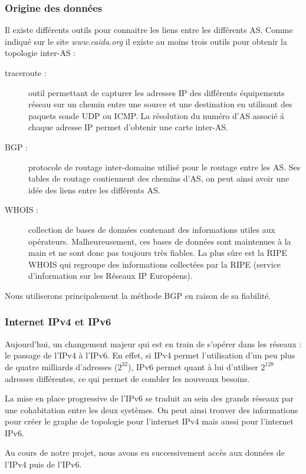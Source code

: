 \subsubsection{Origine des donn\'ees}
\par
Il existe diff\'erents outils pour connaitre les liens entre les diff\'erents AS. Comme indiqu\'e sur le site \textit{www.caida.org} il existe au moins trois outils pour obtenir la topologie inter-AS :
\begin{description}
 \item[traceroute : ] outil permettant de capturer les adresses IP des diff\'erents \'equipements r\'eseau sur un chemin entre une source et une destination en utilisant des paquets sonde UDP ou ICMP. La r\'esolution du num\'ero d'AS associ\'e \'a chaque adresse IP permet d'obtenir une carte inter-AS.
 \item[BGP : ] protocole de routage inter-domaine utilis\'e pour le routage entre les AS. Ses tables de routage contiennent des chemins d'AS, on peut ainsi avoir une idée des liens entre les diff\'erents AS.
 \item[WHOIS : ] collection de bases de donn\'ees contenant des informations utiles aux op\'erateurs. Malheureusement, ces bases de donn\'ees sont maintenues \`a la main et ne  sont donc pas toujours tr\`es fiables. La plus sûre est la RIPE WHOIS qui regroupe des informations collect\'ees par la RIPE (service d'information sur les R\'eseaux IP Europ\'eens).
\end{description}
\par
Nous utiliserons principalement la m\'ethode BGP en raison de sa fiabilit\'e.

\subsubsection{Internet IPv4 et IPv6}
\par
Aujourd'hui, un changement majeur qui est en train de s'op\'erer dans les r\'eseaux : le passage de l'IPv4 \`a l'IPv6. En effet, si IPv4 permet l'utilisation d'un peu plus de quatre milliards d'adresses ($2^{32}$), IPv6 permet quant \`a lui d'utiliser $2^{128}$ adresses diff\'erentes, ce qui permet de combler les nouveaux besoins.
\par
La mise en place progressive de l'IPv6 se traduit au sein des grands r\'eseaux par une cohabitation entre les deux syst\`emes. On peut ainsi trouver des informations pour cr\'eer le graphe de topologie pour l'internet IPv4 mais aussi pour l'internet IPv6.
\par
Au cours de notre projet, nous avons eu successivement acc\`es aux donn\'ees de l'IPv4 puis de l'IPv6.
% 
